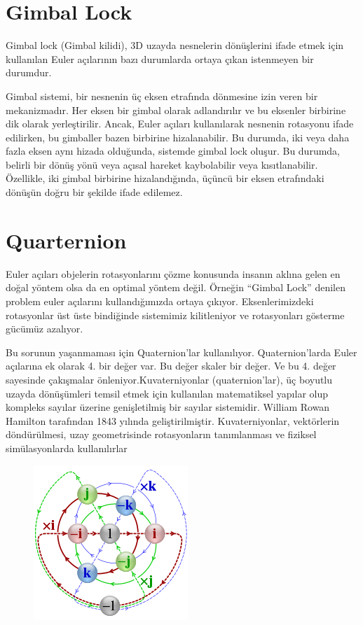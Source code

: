 \documentclass[12pt, a4paper]{article}
\begin{document}
\section{Gimbal Lock}
Gimbal lock (Gimbal kilidi), 3D uzayda nesnelerin dönüşlerini ifade etmek için kullanılan Euler açılarının bazı durumlarda ortaya çıkan istenmeyen bir durumdur.

Gimbal sistemi, bir nesnenin üç eksen etrafında dönmesine izin veren bir mekanizmadır. Her eksen bir gimbal olarak adlandırılır ve bu eksenler birbirine dik olarak yerleştirilir. Ancak, Euler açıları kullanılarak nesnenin rotasyonu ifade edilirken, bu gimballer bazen birbirine hizalanabilir. Bu durumda, iki veya daha fazla eksen aynı hizada olduğunda, sistemde gimbal lock oluşur.
Bu durumda, belirli bir dönüş yönü veya açısal hareket kaybolabilir veya kısıtlanabilir. Özellikle, iki gimbal birbirine hizalandığında, üçüncü bir eksen etrafındaki dönüşün doğru bir şekilde ifade edilemez.
\section {Quarternion}
Euler açıları objelerin rotasyonlarını çözme konusunda insanın aklına gelen en doğal yöntem olsa da en optimal yöntem değil. Örneğin “Gimbal Lock” denilen problem euler açılarını kullandığımızda ortaya çıkıyor. Eksenlerimizdeki rotasyonlar üst üste bindiğinde sistemimiz kilitleniyor ve rotasyonları gösterme gücümüz azalıyor.



Bu sorunun yaşanmaması için Quaternion’lar kullanılıyor. Quaternion’larda Euler açılarına ek olarak 4. bir değer var. Bu değer skaler bir değer. Ve bu 4. değer sayesinde çakışmalar önleniyor.Kuvaterniyonlar (quaternion'lar), üç boyutlu uzayda dönüşümleri temsil etmek için kullanılan matematiksel yapılar olup kompleks sayılar üzerine genişletilmiş bir sayılar sistemidir. William Rowan Hamilton tarafından 1843 yılında geliştirilmiştir.  Kuvaterniyonlar, vektörlerin döndürülmesi, uzay geometrisinde rotasyonların tanımlanması ve fiziksel simülasyonlarda kullanılırlar


\begin{figure}[h]
	\centering
	\includegraphics[width=8 cm  ,height=5 cm  ]{quaternion.png}
\end{figure}
\end{document}
